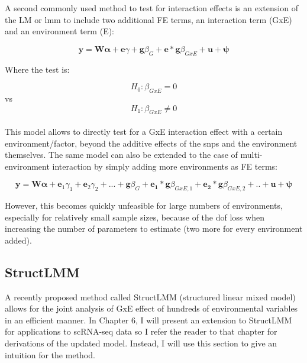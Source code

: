 A second commonly used method to test for interaction effects is an extension of the LM or \gls{lmm} to include two additional FE terms, an interaction term (GxE) and an environment term (E):

\begin{equation}\label{eq:Interaction_test_FE_LMM}
 \mathbf{y} =  \mathbf{W}\boldsymbol{\alpha} + \mathbf{e}\gamma  + \mathbf{g}\beta_G + \mathbf{e}*\mathbf{g}\beta_{GxE} + \mathbf{u} + \boldsymbol{\psi} 
\end{equation}

Where the test is:

\begin{equation}
 H_{0}: \beta_{GxE}=0 
\end{equation}
vs
\begin{equation}
 H_{1}: \beta_{GxE} \neq 0 
\end{equation}\\

This model allows to directly test for a GxE interaction effect with a certain environment/factor, beyond the additive effects of the \gls{snps} and the environment themselves. 
The same model can also be extended to the case of multi-environment interaction by simply adding more environments as FE terms:

\begin{equation}\label{eq:multi_interaction_test_FE_LMM}
 \mathbf{y} =  \mathbf{W}\boldsymbol{\alpha} + \mathbf{e}_1\gamma_1 + \mathbf{e}_2\gamma_2 + ...  + \mathbf{g}\beta_G + \mathbf{e_1}*\mathbf{g}\beta_{GxE,1}+ \mathbf{e_2}*\mathbf{g}\beta_{GxE,2} + .. + \mathbf{u} + \boldsymbol{\psi} 
\end{equation}

However, this becomes quickly unfeasible for large numbers of environments, especially for relatively small sample sizes, because of the dof loss when increasing the number of parameters to estimate (two more for every environment added).


\subsection{StructLMM}

A recently proposed method called StructLMM (structured linear mixed model) allows for the joint analysis of GxE effect of hundreds of environmental variables \cite{moore2019linear} in an efficient manner.
In Chapter 6, I will present an extension to StructLMM for applications to scRNA-seq data so I refer the reader to that chapter for derivations of the updated model.
Instead, I will use this section to give an intuition for the method.\\

